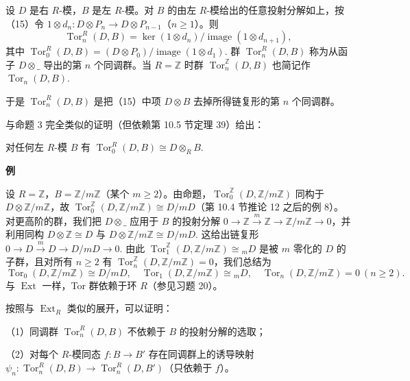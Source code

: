 \begin{definition}
设 \(D\) 是右 \(R\)-模，\(B\) 是左 \(R\)-模。对 \(B\) 的由左 \(R\)-模给出的任意投射分解如上，按（15）令 \(1 \otimes d_n : D \otimes P_n \to D \otimes P_{n-1}\)（\(n \geq 1\)）。则
\[
\operatorname{Tor}_n^R(D, B) = \ker(1 \otimes d_n)/\operatorname{image}(1 \otimes d_{n+1}),
\]
其中 \(\operatorname{Tor}_0^R(D, B) = (D \otimes P_0)/\operatorname{image}(1 \otimes d_1)\). 群 \(\operatorname{Tor}_n^R(D, B)\) 称为从函子 \(D \otimes \_\) 导出的第 \(n\) 个同调群。当 \(R = \mathbb{Z}\) 时群 \(\operatorname{Tor}_n^{\mathbb{Z}}(D, B)\) 也简记作 \(\operatorname{Tor}_n(D, B)\).
\end{definition}

于是 \(\operatorname{Tor}_n^R(D, B)\) 是把（15）中项 \(D \otimes B\) 去掉所得链复形的第 \(n\) 个同调群。

与命题 3 完全类似的证明（但依赖第 10.5 节定理 39）给出：

\begin{proposition}\label{pro:17.13}
对任何左 \(R\)-模 \(B\) 有 \(\operatorname{Tor}_0^R(D, B) \cong D \otimes_RB\).
\end{proposition}

\noindent\textbf{例}

设 \(R = \mathbb{Z}\)，\(B = \mathbb{Z}/m\mathbb{Z}\)（某个 \(m \geq 2\)）。由命题，\(\operatorname{Tor}_0^{\mathbb{Z}}(D, \mathbb{Z}/m\mathbb{Z})\) 同构于 \(D \otimes \mathbb{Z}/m\mathbb{Z}\)，故 \(\operatorname{Tor}_0^{\mathbb{Z}}(D, \mathbb{Z}/m\mathbb{Z}) \cong D/mD\)（第 10.4 节推论 12 之后的例 8）。对更高阶的群，我们把 \(D \otimes \_\) 应用于 \(B\) 的投射分解 \(0 \to \mathbb{Z} \xrightarrow{m} \mathbb{Z} \to \mathbb{Z}/m\mathbb{Z} \to 0\)，并利用同构 \(D \otimes \mathbb{Z} \cong D\) 与 \(D \otimes \mathbb{Z}/m\mathbb{Z} \cong D/mD\). 这给出链复形 \(0 \to D \xrightarrow{m} D \to D/mD \to 0\). 由此 \(\operatorname{Tor}_1^{\mathbb{Z}}(D, \mathbb{Z}/m\mathbb{Z}) \cong {}_mD\) 是被 \(m\) 零化的 \(D\) 的子群，且对所有 \(n \geq 2\) 有 \(\operatorname{Tor}_n^{\mathbb{Z}}(D, \mathbb{Z}/m\mathbb{Z}) = 0\)，我们总结为
\[
\operatorname{Tor}_0(D, \mathbb{Z}/m\mathbb{Z}) \cong D/mD, \quad \operatorname{Tor}_1(D, \mathbb{Z}/m\mathbb{Z}) \cong {}_mD, \quad \operatorname{Tor}_n(D, \mathbb{Z}/m\mathbb{Z}) = 0\ (n \geq 2).
\]
与 \(\operatorname{Ext}\) 一样，Tor 群依赖于环 \(R\)（参见习题 20）。

按照与 \(\operatorname{Ext}_R\) 类似的展开，可以证明：

\begin{proposition}\label{pro:17.14}
（1）同调群 \(\operatorname{Tor}_n^R(D, B)\) 不依赖于 \(B\) 的投射分解的选取；

（2）对每个 \(R\)-模同态 \(f : B \to B'\) 存在同调群上的诱导映射 \(\psi_n : \operatorname{Tor}_n^R(D, B) \to \operatorname{Tor}_n^R(D, B')\)（只依赖于 \(f\)）。
\end{proposition}

